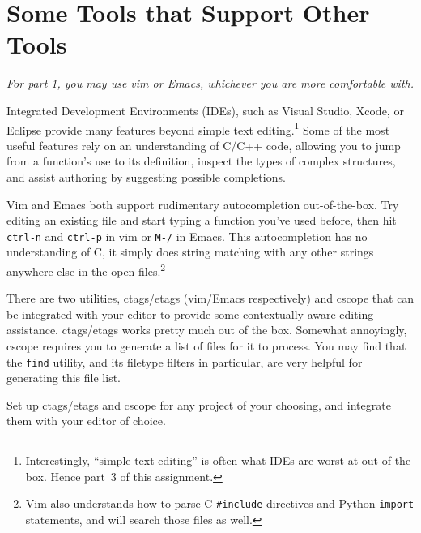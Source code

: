 \documentclass{article}
\begin{document}

\medskip
\noindent
\section{Some Tools that Support Other Tools}
\emph{For part 1, you may use vim or Emacs, whichever you are more comfortable
  with.}

Integrated Development Environments (IDEs), such as Visual Studio, Xcode, or
Eclipse provide many features beyond simple text editing.\footnote{
  Interestingly, ``simple text editing'' is often what IDEs are worst at
  out-of-the-box. Hence part~3 of this assignment.
}
Some of the most useful features rely on an understanding of C/C++ code,
allowing you to jump from a function's use to its definition, inspect the types
of complex structures, and assist authoring by suggesting possible
completions.

Vim and Emacs both support rudimentary autocompletion out-of-the-box. Try
editing an existing file and start typing a function you've used before, then
hit \texttt{ctrl-n} and \texttt{ctrl-p} in vim or \texttt{M-/} in Emacs. This
autocompletion has no understanding of C, it simply does string matching with
any other strings anywhere else in the open files.\footnote{
  Vim also understands how to parse C \texttt{\#include} directives and Python
  \texttt{import} statements, and will search those files as well.
}

There are two utilities, ctags/etags (vim/Emacs respectively) and cscope that
can be integrated with your editor to provide some contextually aware editing
assistance.
ctags/etags works pretty much out of the box. Somewhat annoyingly, cscope
requires you to generate a list of files for it to process. You may find that
the \texttt{find} utility, and its filetype filters in particular, are very
helpful for generating this file list.

Set up ctags/etags and cscope for any project of your choosing, and integrate
them with your editor of choice.
\end{document}
